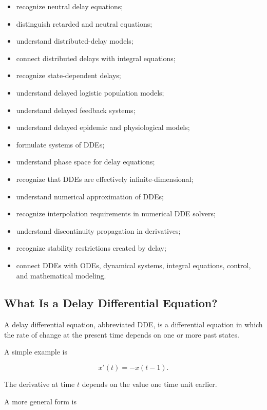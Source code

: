 {\begin{itemize}
          equations;
    \item recognize neutral delay equations;
    \item distinguish retarded and neutral equations;
    \item understand distributed-delay models;
    \item connect distributed delays with integral equations;
    \item recognize state-dependent delays;
    \item understand delayed logistic population models;
    \item understand delayed feedback systems;
    \item understand delayed epidemic and physiological models;
    \item formulate systems of DDEs;
    \item understand phase space for delay equations;
    \item recognize that DDEs are effectively infinite-dimensional;
    \item understand numerical approximation of DDEs;
    \item recognize interpolation requirements in numerical DDE solvers;
    \item understand discontinuity propagation in derivatives;
    \item recognize stability restrictions created by delay;
    \item connect DDEs with ODEs, dynamical systems, integral equations,
          control, and mathematical modeling.
\end{itemize}
}

\subsection{What Is a Delay Differential Equation?}
\label{subsec:what-is-delay-differential-equation}

A delay differential equation, abbreviated DDE, is a differential
equation in which the rate of change at the present time depends on one
or more past states.

A simple example is

\[
\boxed{
x'(t)
=
-x(t-1).
}
\]

The derivative at time \(t\) depends on the value one time unit earlier.

A more general form is

